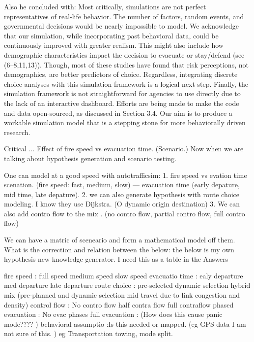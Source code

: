 Also he concluded with: Most critically, simulations are not perfect representatives of real-life behavior. The number of factors, random events, and governmental decisions would be nearly impossible to model. We acknowledge that our simulation, while incorporating past behavioral data, could be continuously improved with greater realism. This might also include how demographic characteristics impact the decision to evacuate or stay/defend (see (6–8,11,13)). Though, most of these studies have found that risk perceptions, not demographics, are better predictors of choice. Regardless, integrating discrete choice analyses with this simulation framework is a logical next step. Finally, the simulation framework is not straightforward for agencies to use directly due to the lack of an interactive dashboard. Efforts are being made to make the code and data open-sourced, as discussed in Section 3.4. Our aim is to produce a workable simulation model that is a stepping stone for more behaviorally driven research.


Critical ... Effect of fire speed vs evacuation time. (Scenario.) Now when we are talking about hypothesis generation and scenario testing. 

One can model at a good speed with autotrafficsim:
1. fire speed vs evation time scenation. (fire speed: fast, medium, slow)  --- evacuation time (early depature, mid time, late depature). 
2. we can also generate hypothesis with route choice modeling. I know they use Dijkstra.  (O dynamic origin destination) 
3. We can also add contro flow to the mix .   (no contro flow, partial contro flow, full contro flow)

We can have a matric of sceneario and form a mathematical model off them. What is the correction and relation between the below: 
the below is my own hypothesis new knowledge generator. I need this as a table in the Answers

fire speed            : full speed        medium speed         slow speed 
evacuatio time        : ealy departure    med departure        late departure
route choice          : pre-selected      dynamic selection    hybrid mix (pre-planned and dynamic selection mid travel due to link congestion and density)
control flow          : No contro flow    half contra flow     full contraflow 
phased evacuation     : No evac           phases               full evacuation : (How does this cause panic mode???? )
behavioral assumptio  :Is this needed or mapped. (eg GPS data I am not sure of this. ) eg Transportation towing, mode split. 

